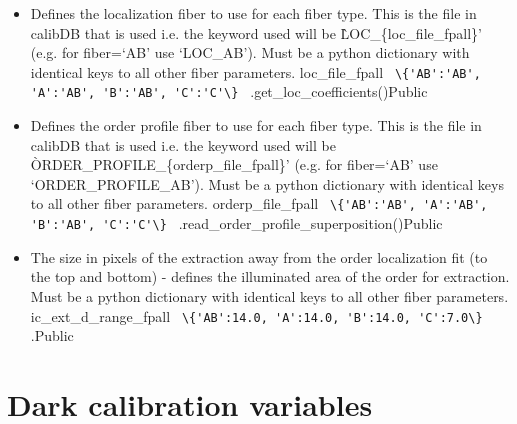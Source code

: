 \begin{itemize}
\item {}
{Defines the localization fiber to use for each fiber type. This is the file in calibDB that is used i.e. the keyword \masterCALIBDBfile used will be \`LOC\_\{loc\_file\_fpall\}' (e.g. for fiber=`AB' use `LOC\_AB'). Must be a python dictionary with identical keys to all other fiber parameters.}
{loc\_file\_fpall}
{\lstinline[style=pythoninline]| \{'AB':'AB', 'A':'AB', 'B':'AB', 'C':'C'\} |}
{\calextractRAW}{\constantsfile}
{\spirouLOCOR.get\_loc\_coefficients()}{Public}

\item {}
{Defines the order profile fiber to use for each fiber type. This is the file in calibDB that is used i.e. the keyword \masterCALIBDBfile used will be \`ORDER\_PROFILE\_\{orderp\_file\_fpall\}' (e.g. for fiber=`AB' use `ORDER\_PROFILE\_AB'). Must be a python dictionary with identical keys to all other fiber parameters.}
{orderp\_file\_fpall}
{\lstinline[style=pythoninline]| \{'AB':'AB', 'A':'AB', 'B':'AB', 'C':'C'\} |}
{\calextractRAW}{\constantsfile}
{\spirouFITS.read\_order\_profile\_superposition()}{Public}

\item {}
{The size in pixels of the extraction away from the order localization fit (to the top and bottom) - defines the illuminated area of the order for extraction. Must be a python dictionary with identical keys to all other fiber parameters.}
{ic\_ext\_d\_range\_fpall}
{\lstinline[style=pythoninline]| \{'AB':14.0, 'A':14.0, 'B':14.0, 'C':7.0\} |}
{\calDRIFTRAW}{\constantsfile}
{\calDRIFTRAW.\progMAIN}{Public}

\end{itemize}






\clearpage
\newpage
\section{Dark calibration variables}
\label{ch:variables:dark}

